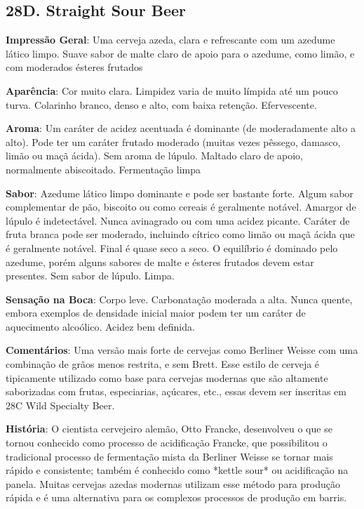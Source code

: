 \subsection*{28D. Straight Sour Beer}

\textbf{Impressão Geral}: Uma cerveja azeda, clara e refrescante com um azedume lático limpo. Suave sabor de malte claro de apoio para o azedume, como limão, e com moderados ésteres frutados

\textbf{Aparência}: Cor muito clara. Limpidez varia de muito límpida até um pouco turva. Colarinho branco, denso e alto, com baixa retenção. Efervescente.

\textbf{Aroma}: Um caráter de acidez acentuada é dominante (de moderadamente alto a alto). Pode ter um caráter frutado moderado (muitas vezes pêssego, damasco, limão ou maçã ácida). Sem aroma de lúpulo. Maltado claro de apoio, normalmente abiscoitado. Fermentação limpa

\textbf{Sabor}: Azedume lático limpo dominante e pode ser bastante forte. Algum sabor complementar de pão, biscoito ou como cereais é geralmente notável. Amargor de lúpulo é indetectável. Nunca avinagrado ou com uma acidez picante. Caráter de fruta branca pode ser moderado, incluindo cítrico como limão ou maçã ácida que é geralmente notável. Final é quase seco a seco. O equilíbrio é dominado pelo azedume, porém alguns sabores de malte e ésteres frutados devem estar presentes. Sem sabor de lúpulo. Limpa.

\textbf{Sensação na Boca}: Corpo leve. Carbonatação moderada a alta. Nunca quente, embora exemplos de densidade inicial maior podem ter um caráter de aquecimento alcoólico. Acidez bem definida.

\textbf{Comentários}: Uma versão mais forte de cervejas como Berliner Weisse com uma combinação de grãos menos restrita, e sem Brett. Esse estilo de cerveja é tipicamente utilizado como base para cervejas modernas que são altamente saborizadas com frutas, especiarias, açúcares, etc., essas devem ser inscritas em 28C Wild Specialty Beer.

\textbf{História}: O cientista cervejeiro alemão, Otto Francke, desenvolveu o que se tornou conhecido como processo de acidificação Francke, que possibilitou o tradicional processo de fermentação mista da Berliner Weisse se tornar mais rápido e consistente; também é conhecido como *kettle sour* ou acidificação na panela. Muitas cervejas azedas modernas utilizam esse método para produção rápida e é uma alternativa para os complexos processos de produção em barris.

